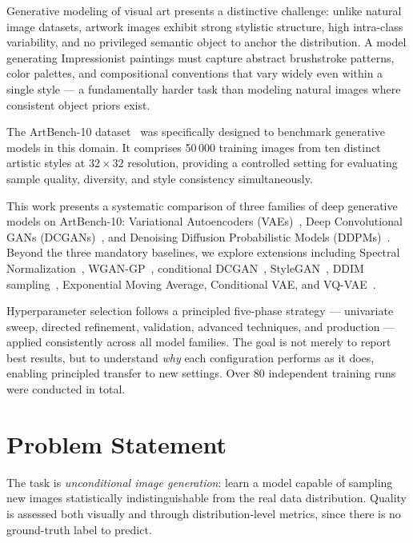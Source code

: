 \documentclass[runningheads]{llncs}
\begin{document}
Generative modeling of visual art presents a distinctive challenge: unlike natural image datasets, artwork images exhibit strong stylistic structure, high intra-class variability, and no privileged semantic object to anchor the distribution. A model generating Impressionist paintings must capture abstract brushstroke patterns, color palettes, and compositional conventions that vary widely even within a single style — a fundamentally harder task than modeling natural images where consistent object priors exist.

The ArtBench-10 dataset~\cite{liao2022} was specifically designed to benchmark generative models in this domain. It comprises 50\,000 training images from ten distinct artistic styles at $32{\times}32$ resolution, providing a controlled setting for evaluating sample quality, diversity, and style consistency simultaneously.

This work presents a systematic comparison of three families of deep generative models on ArtBench-10: Variational Autoencoders (VAEs)~\cite{kingma2013}, Deep Convolutional GANs (DCGANs)~\cite{radford2015}, and Denoising Diffusion Probabilistic Models (DDPMs)~\cite{ho2020}. Beyond the three mandatory baselines, we explore extensions including Spectral Normalization~\cite{miyato2018}, WGAN-GP~\cite{gulrajani2017}, conditional DCGAN~\cite{sohn2015}, StyleGAN~\cite{karras2018}, DDIM sampling~\cite{song2020}, Exponential Moving Average, Conditional VAE, and VQ-VAE~\cite{oord2017}.

Hyperparameter selection follows a principled five-phase strategy — univariate sweep, directed refinement, validation, advanced techniques, and production — applied consistently across all model families. The goal is not merely to report best results, but to understand \emph{why} each configuration performs as it does, enabling principled transfer to new settings. Over 80 independent training runs were conducted in total.


\section{Problem Statement}\label{sec:problem}

The task is \emph{unconditional image generation}: learn a model capable of sampling new images statistically indistinguishable from the real data distribution. Quality is assessed both visually and through distribution-level metrics, since there is no ground-truth label to predict.
\end{document}
